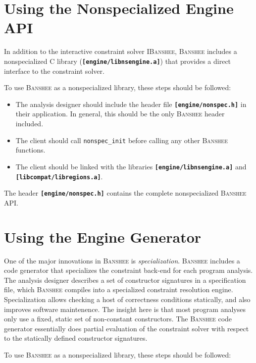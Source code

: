 \documentclass[10pt]{article}
\newcommand{\banshee}{\textsc{Banshee}}
\newcommand{\ibanshee}{\textsc{IBanshee}}
\newcommand{\file}[1]{\texttt{\textbf{[#1]}}}
\begin{document}
\section{Using the Nonspecialized Engine API} 
\label{sec-nonspec}

In addition to the interactive constraint solver \ibanshee{},
\banshee{} includes a nonspecialized C library
(\file{engine/libnsengine.a}) that provides a direct interface to the
constraint solver.

To use \banshee{} as a nonspecialized library, these steps should
be followed:

\begin{itemize}
\item The analysis designer should include the header file
  \file{engine/nonspec.h} in their application. In general, this
  should be the only \banshee{} header included.
\item The client should call \texttt{nonspec\_init} before calling any
  other \banshee{} functions.
\item The client should be linked with the libraries
  \file{engine/libnsengine.a} and \file{libcompat/libregions.a}.
\end{itemize}

The header \file{engine/nonspec.h} contains the complete
nonspecialized \banshee{} API.

\section{Using the Engine Generator}
\label{sec-spec}

One of the major innovations in \banshee{} is
\emph{specialization}. \banshee{} includes a code generator that
specializes the constraint back-end for each program analysis. The
analysis designer describes a set of constructor signatures in a
specification file, which \banshee{} compiles into a specialized
constraint resolution engine. Specialization allows checking a host of
correctness conditions statically, and also improves software
maintenence. The insight here is that most program analyses only use a
fixed, static set of non-constant constructors. The \banshee{} code
generator essentially does partial evaluation of the constraint solver
with respect to the statically defined constructor signatures.

To use \banshee{} as a nonspecialized library, these steps should
be followed:
\end{document}
